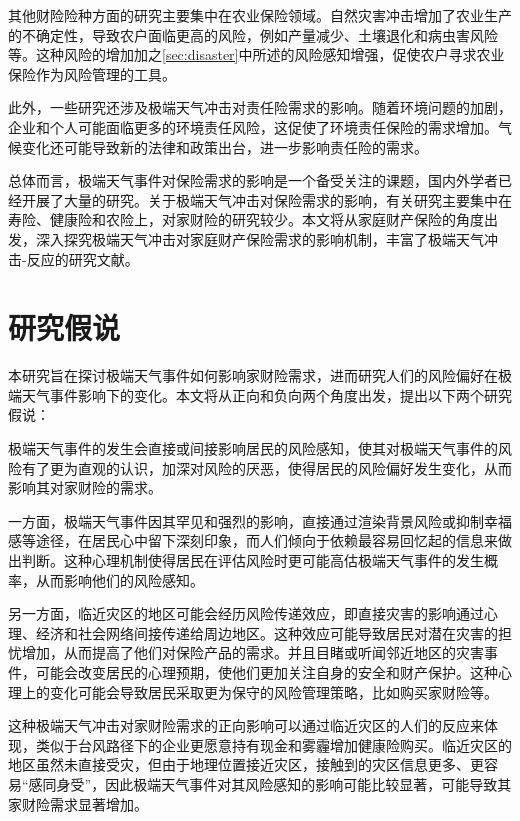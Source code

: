 其他财险险种方面的研究主要集中在农业保险领域。自然灾害冲击增加了农业生产的不确定性，导致农户面临更高的风险，例如产量减少、土壤退化和病虫害风险等。这种风险的增加加之\ref{sec:disaster}中所述的风险感知增强，促使农户寻求农业保险作为风险管理的工具\citep{falco2014crop,胡新艳2021气候变化,TJLT202108007}。

此外，一些研究还涉及极端天气冲击对责任险需求的影响。随着环境问题的加剧，企业和个人可能面临更多的环境责任风险，这促使了环境责任保险的需求增加\citep{ZJTG201030055,刘娟2016环境责任保险需求不足的成因及对策分析}。气候变化还可能导致新的法律和政策出台，进一步影响责任险的需求\citep{2009160355.nh,BXYJ200406005}。

总体而言，极端天气事件对保险需求的影响是一个备受关注的课题，国内外学者已经开展了大量的研究。关于极端天气冲击对保险需求的影响，有关研究主要集中在寿险\citep{avdeenko2021impact}、健康险\citep{2018Something}和农险\citep{胡新艳2021气候变化}上，对家财险的研究较少。本文将从家庭财产保险的角度出发，深入探究极端天气冲击对家庭财产保险需求的影响机制，丰富了极端天气冲击-反应的研究文献。

\section{研究假说}

本研究旨在探讨极端天气事件如何影响家财险需求，进而研究人们的风险偏好在极端天气事件影响下的变化。本文将从正向和负向两个角度出发，提出以下两个研究假说：

极端天气事件的发生会直接或间接影响居民的风险感知，使其对极端天气事件的风险有了更为直观的认识，加深对风险的厌恶\citep{gollier1996risk}，使得居民的风险偏好发生变化，从而影响其对家财险的需求。

一方面，极端天气事件因其罕见和强烈的影响，直接通过渲染背景风险\citep{cameron2015risk}或抑制幸福感\citep{avdeenko2021impact}等途径，在居民心中留下深刻印象，而人们倾向于依赖最容易回忆起的信息来做出判断\citep{tversky1973availability}。这种心理机制使得居民在评估风险时更可能高估极端天气事件的发生概率，从而影响他们的风险感知。

另一方面，临近灾区的地区可能会经历风险传递效应\citep{ZGRK202210006}，即直接灾害的影响通过心理、经济和社会网络间接传递给周边地区。这种效应可能导致居民对潜在灾害的担忧增加，从而提高了他们对保险产品的需求。并且目睹或听闻邻近地区的灾害事件，可能会改变居民的心理预期，使他们更加关注自身的安全和财产保护\citep{yasuda2019changes}。这种心理上的变化可能会导致居民采取更为保守的风险管理策略，比如购买家财险等。

这种极端天气冲击对家财险需求的正向影响可以通过临近灾区的人们的反应来体现，类似于台风路径下的企业更愿意持有现金\citep{0Do}和雾霾增加健康险购买\citep{赵强2021空气污染对商业健康保险需求的影响}。临近灾区的地区虽然未直接受灾，但由于地理位置接近灾区，接触到的灾区信息更多、更容易“感同身受”，因此极端天气事件对其风险感知的影响可能比较显著\citep{0Do}，可能导致其家财险需求显著增加。

